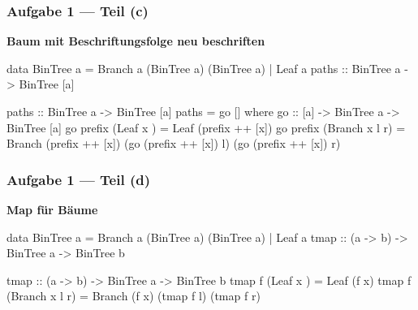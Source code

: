 \documentclass{beamer}
\begin{document}
\begin{frame}[fragile, t] \frametitle{Aufgabe 1 --- Teil (c)}
	\textbf{Baum mit Beschriftungsfolge neu beschriften}
	
	\begin{codebox}
data BinTree a = Branch a (BinTree a) (BinTree a) | Leaf a
paths :: BinTree a -> BinTree [a]
	\end{codebox}
	
	\bigskip \pause
	
	\begin{codebox}
paths :: BinTree a -> BinTree [a]
paths = go []
  where
      go :: [a] -> BinTree a -> BinTree [a]
      go prefix (Leaf   x    ) = Leaf (prefix ++ [x])
      go prefix (Branch x l r) 
      	= Branch (prefix ++ [x]) 
      	    (go (prefix ++ [x]) l) 
      	    (go (prefix ++ [x]) r)
	\end{codebox}
\end{frame}


\begin{frame}[fragile, t] \frametitle{Aufgabe 1 --- Teil (d)}
	\textbf{Map für Bäume}
	
	\begin{codebox}
data BinTree a = Branch a (BinTree a) (BinTree a) | Leaf a
tmap :: (a -> b) -> BinTree a -> BinTree b
	\end{codebox}
	
	\bigskip \pause
	
	\begin{codebox}
tmap :: (a -> b) -> BinTree a -> BinTree b
tmap f (Leaf   x    ) = Leaf   (f x)
tmap f (Branch x l r) = Branch (f x) (tmap f l) (tmap f r)
	\end{codebox}
\end{frame}
\end{document}
